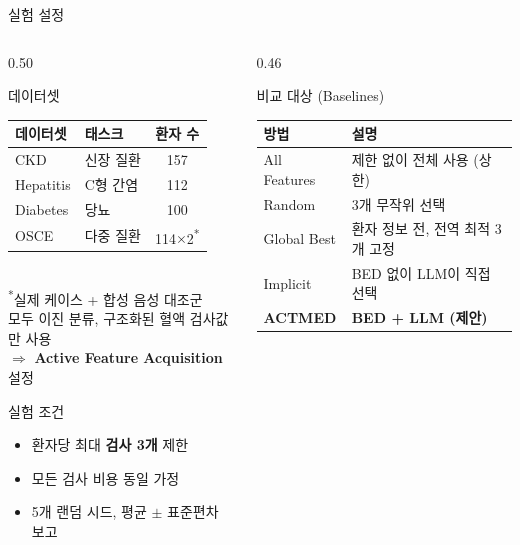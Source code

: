\documentclass[
11pt,notheorems,hyperref={pdfauthor=whatever}
]{beamer}
\begin{document}
\begin{frame}{실험 설정}
\begin{columns}[c]

\begin{column}{0.50\textwidth}

    \begin{block}{데이터셋}
    \footnotesize
    \begin{tabular}{llc}
        \toprule
        데이터셋 & 태스크 & 환자 수 \\
        \midrule
        CKD       & 신장 질환   & 157 \\
        Hepatitis & C형 간염    & 112 \\
        Diabetes  & 당뇨        & 100 \\
        OSCE      & 다중 질환   & 114$\times$2\textsuperscript{*} \\
        \bottomrule
    \end{tabular}\\[0.3em]
    \footnotesize
    \textsuperscript{*}실제 케이스 + 합성 음성 대조군\\
    모두 이진 분류, 구조화된 혈액 검사값만 사용\\
    $\Rightarrow$ \textbf{Active Feature Acquisition} 설정
    \end{block}

    \vspace{0.4em}

    \begin{block}{실험 조건}
    \footnotesize
    \begin{itemize}
        \item 환자당 최대 \textbf{검사 3개} 제한
        \item 모든 검사 비용 동일 가정
        \item 5개 랜덤 시드, 평균 $\pm$ 표준편차 보고
    \end{itemize}
    \end{block}

\end{column}

\begin{column}{0.46\textwidth}

    \begin{block}{비교 대상 (Baselines)}
    \footnotesize
    \begin{tabular}{lp{3.8cm}}
        \toprule
        방법 & 설명 \\
        \midrule
        All Features & 제한 없이 전체 사용 (상한) \\
        Random       & 3개 무작위 선택 \\
        Global Best  & 환자 정보 전, 전역 최적 3개 고정 \\
        Implicit     & BED 없이 LLM이 직접 선택 \\
        \textbf{ACTMED} & \textbf{BED + LLM (제안)} \\
        \bottomrule
    \end{tabular}
    \end{block}


\end{column}
\end{columns}
\end{frame}
\end{document}
